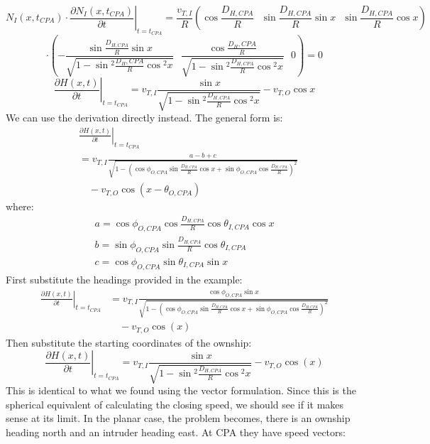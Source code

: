 \begin{theappendices}
\[N_{I}(x,t_{CPA}) \cdot \left. \frac{\partial N_{I}(x,t_{CPA})}{\partial t} \right|_{t=t_{CPA}} = \frac{v_{T,I}}{R} \left( \cos{\frac{D_{H,CPA}}{R} \ \ \ \sin{\frac{D_{H,CPA}}{R}\sin{x}} \ \ \ \sin{\frac{D_{H,CPA}}{R}}\cos{x}} \right)\]
\[\cdot \left( -\frac{\sin{\frac{D_{H,CPA}}{R}}\sin{x}}{\sqrt{1-\sin{^{2}\frac{D_H,CPA}{R}}\cos{^{2}x}}} \ \ \ \frac{\cos{\frac{D_H,CPA}{R}}}{\sqrt{1-\sin{^{2}\frac{D_{H,CPA}}{R}}\cos{^{2}x}}} \ \ \ 0\right) = 0\]
\[\left. \frac{\partial H(x,t)}{\partial t} \right|_{t=t_{CPA}} = v_{T,I}\frac{\sin{x}}{\sqrt{1-\sin{^{2}\frac{D_{H,CPA}}{R}}\cos{^{2}x}}} - v_{T,O}\cos{x}\]
We can use the derivation directly instead. The general form is:
\begin{equation*}
    \begin{aligned}
        &\left. \frac{\partial H(x,t)}{\partial t} \right|_{t=t_{CPA}} \\
        &= v_{T,I} \frac{a-b+c}{\sqrt{1-\left( \cos{\phi_{O,CPA}}\sin{\frac{D_{H,CPA}}{R}}\cos{x} + \sin{\phi_{O,CPA}}\cos{\frac{D_{H,CPA}}{R}} \right)^{2}}}\\
        &\quad - v_{T,O}\cos{(x-\theta_{O,CPA})}
    \end{aligned}
\end{equation*}
where:
\begin{multline*}
    a = \cos{\phi_{O,CPA}}\cos{\frac{D_{H,CPA}}{R}}\cos{\theta_{I,CPA}}\cos{x} \\ 
    b = \sin{\phi_{O,CPA}}\sin{\frac{D_{H,CPA}}{R}}\cos{\theta_{I,CPA}} \\
    c = \cos{\phi_{O,CPA}}\sin{\theta_{I,CPA}}\sin{x}
\end{multline*}
First substitute the headings provided in the example:
\begin{equation*}
    \begin{aligned}
        \left. \frac{\partial H(x,t)}{\partial t} \right|_{t=t_{CPA}}
        &= v_{T,I} \frac{\cos{\phi_{O,CPA}}\sin{x}}{\sqrt{1-\left( \cos{\phi_{O,CPA}}\sin{\frac{D_{H,CPA}}{R}}\cos{x} + \sin{\phi_{O,CPA}}\cos{\frac{D_{H,CPA}}{R}} \right)^{2}}}\\
        &\quad - v_{T,O}\cos{(x)}
    \end{aligned}
\end{equation*}
Then substitute the starting coordinates of the ownship:
\[\left. \frac{\partial H(x,t)}{\partial t} \right|_{t=t_{CPA}} = v_{T,I}\frac{\sin{x}}{\sqrt{1-\sin{^{2}\frac{D_{H,CPA}}{R}}\cos{^{2}x}}} - v_{T,O}\cos{(x)}\]
This is identical to what we found using the vector formulation.
Since this is the spherical equivalent of calculating the closing speed, we should see if it makes sense at its limit. In the planar case, the problem becomes, there is an ownship heading north and an intruder heading east. At CPA they have speed vectors:

\end{theappendices}
